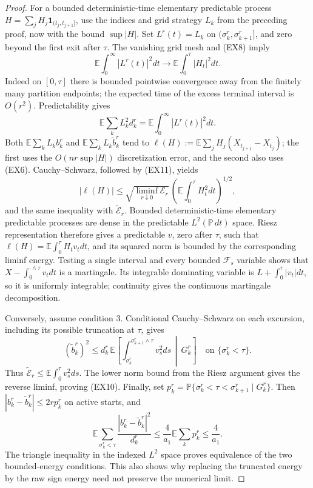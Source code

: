 \documentclass[11pt]{article}
\theoremstyle{definition}\newtheorem{definition}[theorem]{Definition}
\theoremstyle{remark}\newtheorem{remark}[theorem]{Remark}
\begin{document}
\begin{proof}
For a bounded deterministic-time elementary predictable process
$H=\sum_jH_j\mathbf1_{(t_j,t_{j+1}]}$, use the indices and grid strategy
$L_k$ from the preceding proof, now with the bound $\sup|H|$.
Set $L^{r}(t)=L_k$ on $(\sigma^r_k,\sigma^r_{k+1}]$, and zero beyond
the first exit after $\tau$. The vanishing grid mesh and (EX8) imply
\[
 \mathbb E\int_0^\infty|L^{r}(t)|^2dt
       \longrightarrow\mathbb E\int_0^\tau|H_t|^2dt.
 \tag{EX11}
\]
Indeed on $[0,\tau]$ there is bounded pointwise convergence away from the
finitely many partition endpoints; the expected time of the excess
terminal interval is $O(r^2)$. Predictability gives
\[
 \mathbb E\sum_kL_k^2d^r_k
       =\mathbb E\int_0^\infty|L^{r}(t)|^2dt.
\]
Both $\mathbb E\sum_kL_kb^r_k$ and
$\mathbb E\sum_kL_k\widetilde b^r_k$ tend to
$\ell(H):=\mathbb E\sum_jH_j(X_{t_{j+1}}-X_{t_j})$;
the first uses the $O(nr\sup|H|)$ discretization error, and the second
also uses (EX6). Cauchy--Schwarz, followed by (EX11), yields
\[
 |\ell(H)|\le
  \sqrt{\liminf_{r\downarrow0}\mathcal E_r}\,
        \left(\mathbb E\int_0^\tau H_t^2dt\right)^{1/2},
\]
and the same inequality with $\widetilde{\mathcal E}_r$.
Bounded deterministic-time elementary predictable processes are dense
in the predictable $L^2(\mathbb P\,dt)$ space. Riesz representation
therefore gives a predictable $v$, zero after $\tau$, such that
$\ell(H)=\mathbb E\int_0^\tau H_tv_tdt$, and its squared norm is
bounded by the corresponding liminf energy. Testing a single interval
and every bounded $\mathcal F_s$ variable shows that
$X-\int_0^{\cdot\wedge\tau}v_tdt$ is a martingale. Its integrable
dominating variable is $L+\int_0^\tau|v_t|dt$, so it is uniformly
integrable; continuity gives the continuous martingale decomposition.

Conversely, assume condition 3. Conditional Cauchy--Schwarz on each
excursion, including its possible truncation at $\tau$, gives
\[
 (\widetilde b^r_k)^2\le d^r_k\,
  \mathbb E\left[\int_{\sigma^r_k}^{\sigma^r_{k+1}\wedge\tau}
               v_s^2ds\,\middle|\,G^r_k\right]
      \quad\text{on }\{\sigma^r_k<\tau\}.
\]
Thus $\widetilde{\mathcal E}_r\le\mathbb E\int_0^\tau v_s^2ds$.
The lower norm bound from the Riesz argument gives the reverse liminf,
proving (EX10). Finally, set
$p^r_k=\mathbb P\{\sigma^r_k<\tau<\sigma^r_{k+1}\mid G^r_k\}$.
Then $|b^r_k-\widetilde b^r_k|\le2rp^r_k$ on active starts, and
\[
 \mathbb E\sum_{\sigma^r_k<\tau}
       \frac{|b^r_k-\widetilde b^r_k|^2}{d^r_k}
   \le\frac4{a_1}\mathbb E\sum_kp^r_k\le\frac4{a_1}.
\]
The triangle inequality in the indexed $L^2$ space proves equivalence
of the two bounded-energy conditions. This also shows why replacing
the truncated energy by the raw sign energy need not preserve the
numerical limit.
\end{proof}
\end{document}
